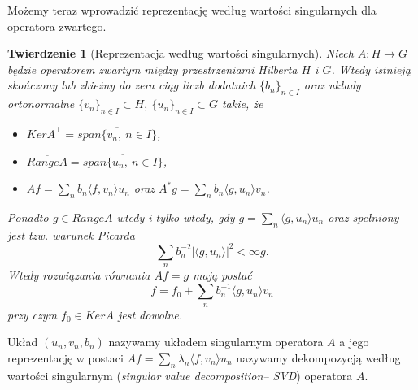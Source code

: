 \documentclass{mwart}
\newtheorem{tw}{Twierdzenie}
\begin{document}
Możemy teraz wprowadzić reprezentację według wartości singularnych dla operatora zwartego.

\begin{tw}[Reprezentacja według wartości singularnych]
Niech $A\colon H\to G$ będzie operatorem zwartym między przestrzeniami Hilberta $H$ i $G$. Wtedy istnieją skończony lub zbieżny do zera ciąg liczb dodatnich $\{b_n\}_{n\in I}$ oraz układy ortonormalne $\{v_n\}_{n\in I}\subset H,\ \{u_n\}_{n\in I}\subset G$ takie, że
\begin{itemize}
\item $KerA^{\perp}=\overline{span\{v_n,\ n\in I\}}$,
\item $\overline{RangeA}=\overline{span\{u_n,\ n\in I\}}$,
\item $Af=\sum_nb_n\langle f, v_n\rangle u_n$ oraz $A^*g=\sum_nb_n\langle g, u_n\rangle v_n$.
\end{itemize}
Ponadto $g\in RangeA$ wtedy i tylko wtedy, gdy $g=\sum_n\langle g, u_n\rangle u_n$ oraz spełniony jest tzw. warunek Picarda
\begin{displaymath} 
\sum_nb_n^{-2}|\langle g, u_n\rangle|^2< \infty g.
\end{displaymath}
Wtedy rozwiązania równania $Af=g$ mają postać 
\begin{displaymath}
f=f_0+\sum_nb_n^{-1}\langle g, u_n\rangle v_n
\end{displaymath}
przy czym $f_0\in KerA$ jest dowolne.
\end{tw}
Układ $(u_n,v_n,b_n)$ nazywamy układem singularnym operatora $A$ a jego reprezentację w postaci $Af=\sum_n\lambda_n\langle f,v_n\rangle u_n$ nazywamy dekompozycją według wartości singularnym (\textit{singular value decomposition-- SVD}) operatora $A$.
\end{document}
